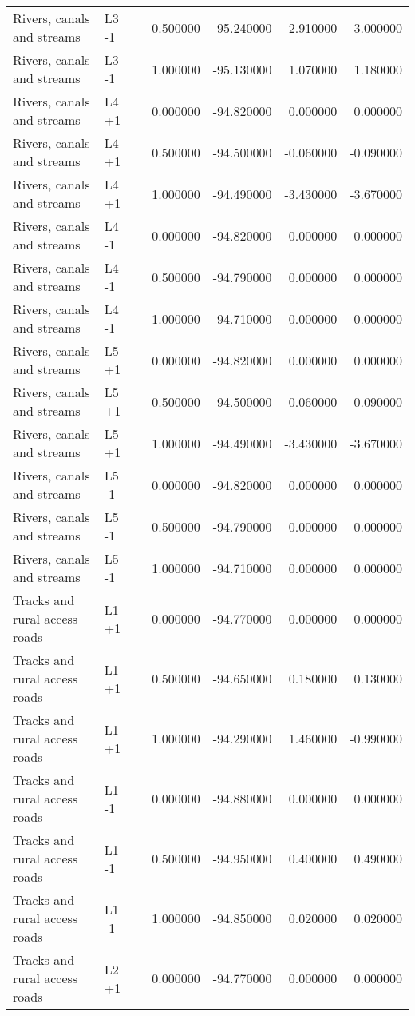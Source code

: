 \begin{tabular}{lllrrrr}
Rivers, canals and streams & L3 -1 &  & 0.500000 & -95.240000 & 2.910000 & 3.000000 \\
Rivers, canals and streams & L3 -1 &  & 1.000000 & -95.130000 & 1.070000 & 1.180000 \\
Rivers, canals and streams & L4 +1 &  & 0.000000 & -94.820000 & 0.000000 & 0.000000 \\
Rivers, canals and streams & L4 +1 &  & 0.500000 & -94.500000 & -0.060000 & -0.090000 \\
Rivers, canals and streams & L4 +1 &  & 1.000000 & -94.490000 & -3.430000 & -3.670000 \\
Rivers, canals and streams & L4 -1 &  & 0.000000 & -94.820000 & 0.000000 & 0.000000 \\
Rivers, canals and streams & L4 -1 &  & 0.500000 & -94.790000 & 0.000000 & 0.000000 \\
Rivers, canals and streams & L4 -1 &  & 1.000000 & -94.710000 & 0.000000 & 0.000000 \\
Rivers, canals and streams & L5 +1 &  & 0.000000 & -94.820000 & 0.000000 & 0.000000 \\
Rivers, canals and streams & L5 +1 &  & 0.500000 & -94.500000 & -0.060000 & -0.090000 \\
Rivers, canals and streams & L5 +1 &  & 1.000000 & -94.490000 & -3.430000 & -3.670000 \\
Rivers, canals and streams & L5 -1 &  & 0.000000 & -94.820000 & 0.000000 & 0.000000 \\
Rivers, canals and streams & L5 -1 &  & 0.500000 & -94.790000 & 0.000000 & 0.000000 \\
Rivers, canals and streams & L5 -1 &  & 1.000000 & -94.710000 & 0.000000 & 0.000000 \\
Tracks and rural access roads & L1 +1 &  & 0.000000 & -94.770000 & 0.000000 & 0.000000 \\
Tracks and rural access roads & L1 +1 &  & 0.500000 & -94.650000 & 0.180000 & 0.130000 \\
Tracks and rural access roads & L1 +1 &  & 1.000000 & -94.290000 & 1.460000 & -0.990000 \\
Tracks and rural access roads & L1 -1 &  & 0.000000 & -94.880000 & 0.000000 & 0.000000 \\
Tracks and rural access roads & L1 -1 &  & 0.500000 & -94.950000 & 0.400000 & 0.490000 \\
Tracks and rural access roads & L1 -1 &  & 1.000000 & -94.850000 & 0.020000 & 0.020000 \\
Tracks and rural access roads & L2 +1 &  & 0.000000 & -94.770000 & 0.000000 & 0.000000 \\

\end{tabular}
